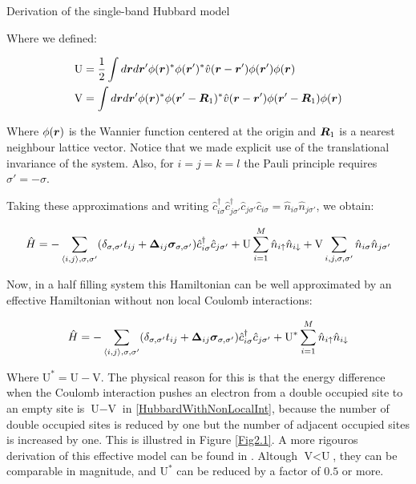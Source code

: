 \begin{section}{Derivation of the single-band Hubbard model}
\begin{itemize}
Where we defined:

\begin{align}
\text{U} &= \frac{1}{2} \int d\boldsymbol{r} d\boldsymbol{r}' \phi(\boldsymbol{r})^* \phi(\boldsymbol{r}')^* \hat{v}(\boldsymbol{r}-\boldsymbol{r}') \phi(\boldsymbol{r}') \phi(\boldsymbol{r}) \\
\text{V} &= \int d\boldsymbol{r} d\boldsymbol{r}' \phi(\boldsymbol{r})^* \phi(\boldsymbol{r}'-\boldsymbol{R}_1)^* \hat{v}(\boldsymbol{r}-\boldsymbol{r}') \phi(\boldsymbol{r}'-\boldsymbol{R}_1) \phi(\boldsymbol{r})
\end{align}

Where $\phi(\boldsymbol{r})$ is the Wannier function centered at the origin and $\boldsymbol{R}_1$ is a nearest neighbour lattice vector. Notice that we made explicit use of the translational invariance of the system. Also, for $i=j=k=l$ the Pauli principle requires $\sigma' = -\sigma$.

\end{itemize}

Taking these approximations and writing $\hat{c}_{i \sigma}^\dagger \hat{c}_{j \sigma'}^\dagger \hat{c}_{j \sigma'} \hat{c}_{i \sigma} = \hat{n}_{i \sigma} \hat{n}_{j \sigma'}$, we obtain:

\begin{equation}
\label{HubbardWithNonLocalInt}
\hat{H} = -\sum_{\langle i,j \rangle, \sigma, \sigma'}(\delta_{\sigma, \sigma'} t_{ij} + \boldsymbol{\Delta}_{ij} \boldsymbol{\sigma}_{\sigma, \sigma'})\hat{c}_{i \sigma}^\dagger \hat{c}_{j \sigma'} + \text{U} \sum_{i=1}^M \hat{n}_{i\uparrow}\hat{n}_{i\downarrow} + \text{V} \sum_{i,j,\sigma,\sigma'}  \hat{n}_{i \sigma} \hat{n}_{j \sigma'}
\end{equation}

Now, in a half filling system this Hamiltonian can be well approximated by an effective Hamiltonian without non local Coulomb interactions:

\begin{equation}
\label{Intermediate}
\hat{H} = -\sum_{\langle i,j \rangle, \sigma, \sigma'}(\delta_{\sigma, \sigma'} t_{ij} + \boldsymbol{\Delta}_{ij} \boldsymbol{\sigma}_{\sigma, \sigma'})\hat{c}_{i \sigma}^\dagger \hat{c}_{j \sigma'} + \text{U}^* \sum_{i=1}^M \hat{n}_{i\uparrow}\hat{n}_{i\downarrow}
\end{equation}

Where $\text{U}^* = \text{U} - \text{V}$. The physical reason for this is that the energy difference when the Coulomb interaction pushes an electron from a double occupied site to an empty site is $\text{U}-\text{V}$ in \ref{HubbardWithNonLocalInt}, because the number of double occupied sites is reduced by one but the number of adjacent occupied sites is increased by one. This is illustred in Figure \ref{Fig2.1}. A more rigouros derivation of this effective model can be found in \cite{Schuler2013}. Altough $\text{V} < \text{U}$, they can be comparable in magnitude, and $\text{U}^*$ can be reduced by a factor of $0.5$ or more.


\end{section}
